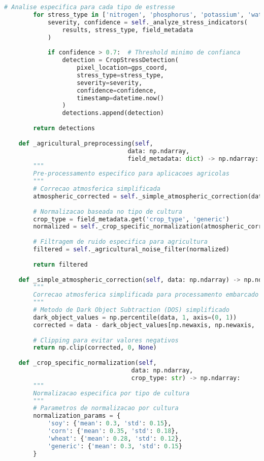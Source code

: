 \begin{lstlisting}[language=Python]
        # Analise especifica para cada tipo de estresse
        for stress_type in ['nitrogen', 'phosphorus', 'potassium', 'water']:
            severity, confidence = self._analyze_stress_indicators(
                results, stress_type, field_metadata
            )
            
            if confidence > 0.7:  # Threshold minimo de confianca
                detection = CropStressDetection(
                    pixel_location=gps_coord,
                    stress_type=stress_type,
                    severity=severity,
                    confidence=confidence,
                    timestamp=datetime.now()
                )
                detections.append(detection)
        
        return detections
    
    def _agricultural_preprocessing(self, 
                                  data: np.ndarray, 
                                  field_metadata: dict) -> np.ndarray:
        """
        Pre-processamento especifico para aplicacoes agricolas
        """
        # Correcao atmosferica simplificada
        atmospheric_corrected = self._simple_atmospheric_correction(data)
        
        # Normalizacao baseada no tipo de cultura
        crop_type = field_metadata.get('crop_type', 'generic')
        normalized = self._crop_specific_normalization(atmospheric_corrected, crop_type)
        
        # Filtragem de ruido especifica para agricultura
        filtered = self._agricultural_noise_filter(normalized)
        
        return filtered
    
    def _simple_atmospheric_correction(self, data: np.ndarray) -> np.ndarray:
        """
        Correcao atmosferica simplificada para processamento embarcado
        """
        # Metodo de Dark Object Subtraction (DOS) simplificado
        dark_object_values = np.percentile(data, 1, axis=(0, 1))
        corrected = data - dark_object_values[np.newaxis, np.newaxis, :]
        
        # Clipping para evitar valores negativos
        return np.clip(corrected, 0, None)
    
    def _crop_specific_normalization(self, 
                                   data: np.ndarray, 
                                   crop_type: str) -> np.ndarray:
        """
        Normalizacao especifica por tipo de cultura
        """
        # Parametros de normalizacao por cultura
        normalization_params = {
            'soy': {'mean': 0.3, 'std': 0.15},
            'corn': {'mean': 0.35, 'std': 0.18},
            'wheat': {'mean': 0.28, 'std': 0.12},
            'generic': {'mean': 0.3, 'std': 0.15}
        }
        

\end{lstlisting}
